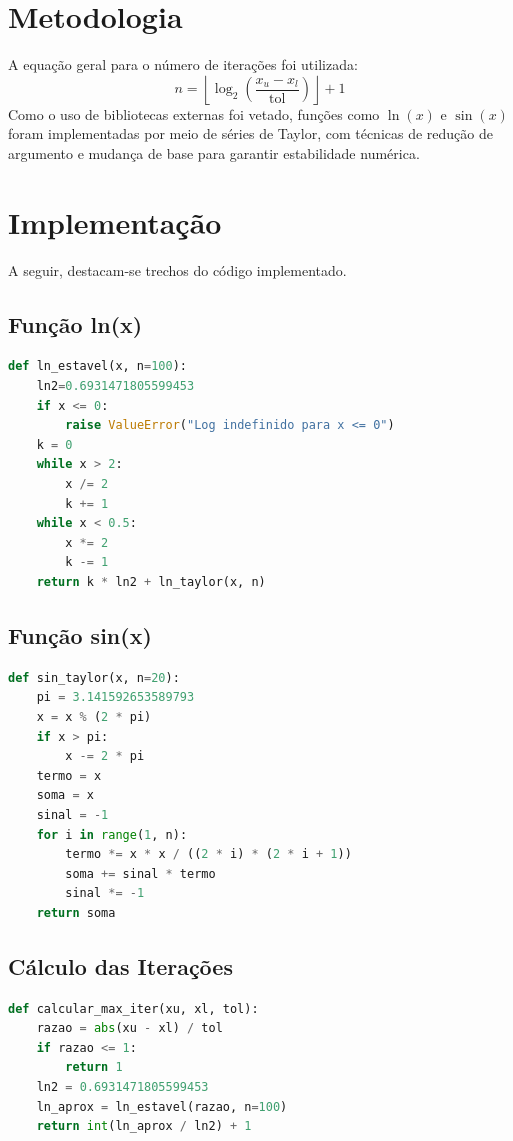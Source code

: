 \documentclass[12pt]{article}
\begin{document}
\section*{Metodologia}
A equação geral para o número de iterações foi utilizada:
\[
n = \left\lfloor \log_2\left(\frac{x_u - x_l}{\text{tol}}\right) \right\rfloor + 1
\]
Como o uso de bibliotecas externas foi vetado, funções como $\ln(x)$ e $\sin(x)$ foram implementadas por meio de séries de Taylor, com técnicas de redução de argumento e mudança de base para garantir estabilidade numérica.

\section*{Implementação}
A seguir, destacam-se trechos do código implementado.

\newpage
\subsection*{Função ln(x)}
\begin{lstlisting}[language=Python]
def ln_estavel(x, n=100):
    ln2=0.6931471805599453
    if x <= 0:
        raise ValueError("Log indefinido para x <= 0")
    k = 0
    while x > 2:
        x /= 2
        k += 1
    while x < 0.5:
        x *= 2
        k -= 1
    return k * ln2 + ln_taylor(x, n)
\end{lstlisting}

\subsection*{Função sin(x)}
\begin{lstlisting}[language=Python]
def sin_taylor(x, n=20):
    pi = 3.141592653589793
    x = x % (2 * pi)
    if x > pi:
        x -= 2 * pi
    termo = x
    soma = x
    sinal = -1
    for i in range(1, n):
        termo *= x * x / ((2 * i) * (2 * i + 1))
        soma += sinal * termo
        sinal *= -1
    return soma
\end{lstlisting}

\subsection*{Cálculo das Iterações}
\begin{lstlisting}[language=Python]
def calcular_max_iter(xu, xl, tol):
    razao = abs(xu - xl) / tol
    if razao <= 1:
        return 1
    ln2 = 0.6931471805599453
    ln_aprox = ln_estavel(razao, n=100)
    return int(ln_aprox / ln2) + 1
\end{lstlisting}
\end{document}

